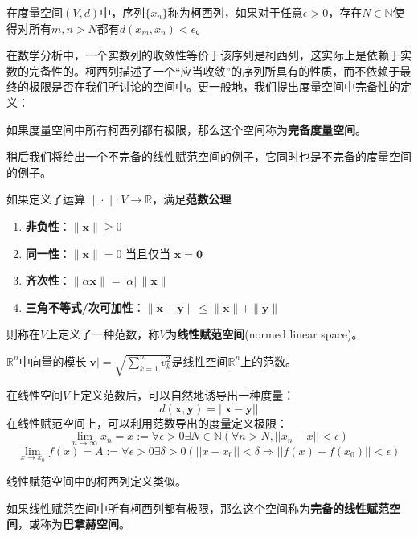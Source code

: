 \begin{definition}[柯西列]
    在度量空间$(V,d)$中，序列$\{x_n\}$称为柯西列，如果对于任意$\epsilon>0$，存在$N\in\mathbb{N}$使得对所有$m,n>N$都有$d(x_m,x_n)<\epsilon$。
\end{definition}
在数学分析中，一个实数列的收敛性等价于该序列是柯西列，这实际上是依赖于实数的完备性的。柯西列描述了一个“应当收敛”的序列所具有的性质，而不依赖于最终的极限是否在我们所讨论的空间中。更一般地，我们提出度量空间中完备性的定义：

\begin{definition}[完备度量空间]
    如果度量空间中所有柯西列都有极限，那么这个空间称为\textbf{完备度量空间}。
\end{definition}

稍后我们将给出一个不完备的线性赋范空间的例子，它同时也是不完备的度量空间的例子。

\begin{definition}[范数]
    如果定义了运算
$\|\cdot \| :V\rightarrow \mathbb{R} $，满足\textbf{范数公理}
\begin{enumerate}
    \item \textbf{非负性}：$\|\mathbf{x}\| \geq 0$
    \item \textbf{同一性}：$\|\mathbf{x}\| = 0$ 当且仅当 $\mathbf{x} = \mathbf{0}$
    \item \textbf{齐次性}：$\|\alpha \mathbf{x}\| = |\alpha| \, \|\mathbf{x}\|$
    \item \textbf{三角不等式/次可加性}：$\|\mathbf{x} + \mathbf{y}\| \leq \|\mathbf{x}\| + \|\mathbf{y}\|$
\end{enumerate}
则称在$V$上定义了一种范数，称$V$为\textbf{线性赋范空间}(normed linear space)。
\end{definition}

\begin{example}
    $\mathbb{R}^n$中向量的模长$|\mathbf{v}|=\sqrt{\sum_{k=1}^n v_k^2}$是线性空间$\mathbb{R}^n$上的范数。
\end{example}

在线性空间$V$上定义范数后，可以自然地诱导出一种度量：
$$d(\mathbf x,\mathbf y)=||\mathbf x-\mathbf y||$$
在线性赋范空间上，可以利用范数导出的度量定义极限：
\[\lim_{n\to\infty}x_n=x:=\forall \epsilon>0\exists N\in\mathbb{N}(\forall n>N,||x_n-x||<\epsilon)\]
\[\lim_{x \to x_0} f(x)=A:=\forall \epsilon>0\exists \delta>0(||x-x_0||<\delta\Rightarrow ||f(x)-f(x_0)||<\epsilon) \]

线性赋范空间中的柯西列定义类似。

\begin{definition}[完备的线性赋范空间]
    如果线性赋范空间中所有柯西列都有极限，那么这个空间称为\textbf{完备的线性赋范空间}，或称为\textbf{巴拿赫空间}\cite{real_analysis}。
\end{definition}

